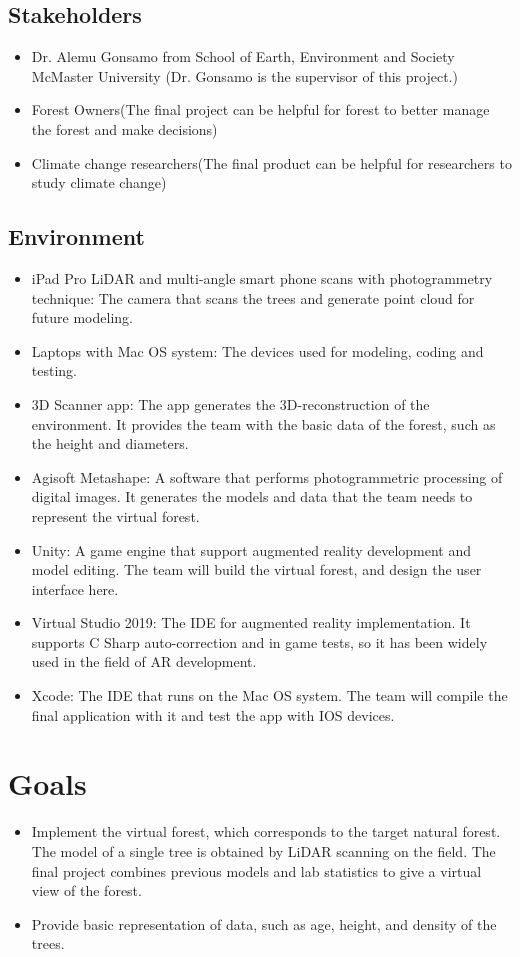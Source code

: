 \documentclass{article}
\begin{document}
\subsection{Stakeholders}
\begin{itemize}
    \item Dr. Alemu Gonsamo from School of Earth, Environment and Society McMaster University (Dr. Gonsamo is the supervisor of this project.)
    \item Forest Owners(The final project can be helpful for forest to better manage the 
    forest and make decisions)
    \item Climate change researchers(The final product can be helpful for researchers to 
    study climate change)
\end{itemize}
\subsection{Environment}
\begin{itemize}
    \item iPad Pro LiDAR and multi-angle smart phone scans with photogrammetry technique: The camera that scans the trees and generate point cloud for future modeling.
    \item Laptops with Mac OS system: The devices used for modeling, coding and testing.
    \item 3D Scanner app: The app generates the 3D-reconstruction of the environment. It provides the team with the basic data of the forest, such as the height and diameters.
    \item Agisoft Metashape: A software that performs photogrammetric processing of digital images. It generates the models and data that the team needs to represent the virtual forest.
    \item Unity: A game engine that support augmented reality development and model editing. The team will build the virtual forest, and design the user interface here.
    \item Virtual Studio 2019: The IDE for augmented reality implementation. It supports C Sharp auto-correction and in game tests, so it has been widely used in the field of AR development.
    \item Xcode: The IDE that runs on the Mac OS system. The team will compile the final application with it and test the app with IOS devices.
\end{itemize}

\section{Goals}
\begin{itemize}
    \item Implement the virtual forest, which corresponds to the target natural forest. The model of a single tree is obtained by LiDAR scanning on the field. The final project combines previous models and lab statistics to give a virtual view of the forest. 
    \item Provide basic representation of data, such as age, height, and density of the trees. 
\end{itemize}
\end{document}
